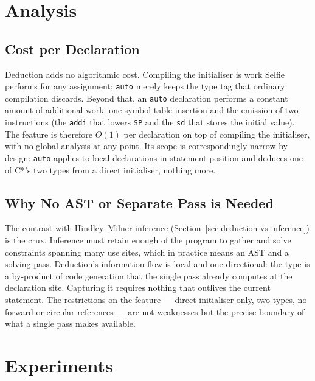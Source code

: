 \documentclass[a4paper,11pt]{article}
\begin{document}
\section{Analysis}
\label{sec:analysis}

\subsection{Cost per Declaration}
\label{sec:cost}

Deduction adds no algorithmic cost. Compiling the initialiser is work Selfie performs for any assignment; \texttt{auto} merely keeps the type tag that ordinary compilation discards. Beyond that, an \texttt{auto} declaration performs a constant amount of additional work: one symbol-table insertion and the emission of two instructions (the \texttt{addi} that lowers \texttt{SP} and the \texttt{sd} that stores the initial value). The feature is therefore $O(1)$ per declaration on top of compiling the initialiser, with no global analysis at any point. Its scope is correspondingly narrow by design: \texttt{auto} applies to local declarations in statement position and deduces one of C*'s two types from a direct initialiser, nothing more.

\subsection{Why No AST or Separate Pass is Needed}
\label{sec:noast}

The contrast with Hindley--Milner inference (Section~\ref{sec:deduction-vs-inference}) is the crux. Inference must retain enough of the program to gather and solve constraints spanning many use sites, which in practice means an AST and a solving pass. Deduction's information flow is local and one-directional: the type is a by-product of code generation that the single pass already computes at the declaration site. Capturing it requires nothing that outlives the current statement. The restrictions on the feature --- direct initialiser only, two types, no forward or circular references --- are not weaknesses but the precise boundary of what a single pass makes available.

\section{Experiments}
\label{sec:evaluation}
\end{document}
